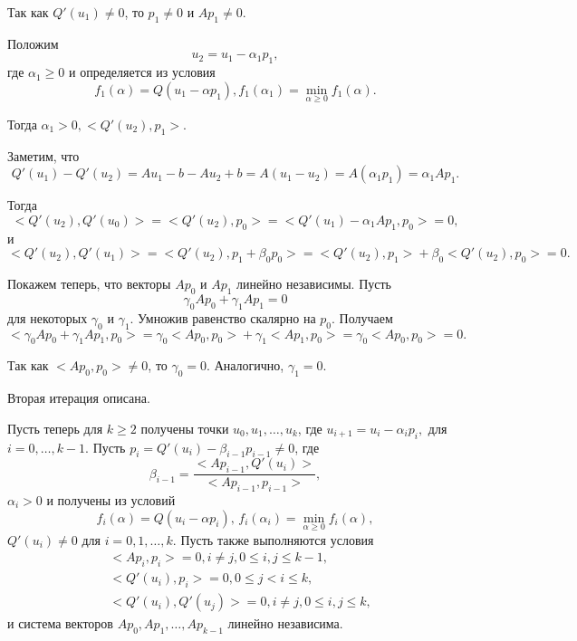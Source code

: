 Так как $Q'(u_1) \not = 0$, то $p_1 \not = 0$ и $A p_1 \not = 0$.

Положим 
\begin{equation*}
	u_2 = u_1 - \alpha_1 p_1, 
\end{equation*}
где $\alpha_1 \geqslant 0$ и определяется из условия 
\begin{equation*}
	f_1(\alpha) = Q(u_1 - \alpha p_1), f_1(\alpha_1) = \min_{\alpha \geqslant 0}{f_1(\alpha)}.
\end{equation*}

Тогда $\alpha_1 > 0, \big<Q'(u_2), p_1\big>$.

Заметим, что 
\begin{equation*}
	Q'(u_1) - Q'(u_2) = A u_1 - b - A u_2 + b = A (u_1 - u_2) = A(\alpha_1 p_1) = \alpha_1 A p_1.
\end{equation*}

Тогда 
\begin{equation*}
	\big<Q'(u_2), Q'(u_0)\big> = \big<Q'(u_2), p_0\big> = \big<Q'(u_1) - \alpha_1 A p_1, p_0\big> = 0,
\end{equation*}
и
\begin{equation*}
	\big<Q'(u_2), Q'(u_1)\big> = \big<Q'(u_2), p_1 + \beta_0 p_0\big> = \big<Q'(u_2), p_1\big> + \beta_0 \big<Q'(u_2), p_0\big> = 0.
\end{equation*}

Покажем теперь, что векторы $A p_0$ и $A p_1$ линейно независимы. Пусть \[\gamma_0 A p_0 + \gamma_1 A p_1 = 0\] для некоторых $\gamma_0$ и $\gamma_1$. Умножив равенство скалярно на $p_0$. Получаем 
\begin{equation*}
	\big<\gamma_0 A p_0 + \gamma_1 A p_1, p_0\big> = \gamma_0 \big<A p_0, p_0\big> + \gamma_1 \big<A p_1, p_0\big> = \gamma_0 \big<A p_0, p_0\big> = 0.
\end{equation*}

Так как $\big<A p_0, p_0\big> \not = 0$, то $\gamma_0 = 0$. Аналогично, $\gamma_1 = 0$.

Вторая итерация описана.

Пусть теперь для $k \geqslant 2$ получены точки $u_0, u_1, \dotsc, u_k$, где $u_{i + 1} = u_i - \alpha_i p_i,$ для $i = 0, \dotsc, k - 1$. Пусть $p_i = Q'(u_i) - \beta_{i - 1} p_{i - 1} \not = 0$, где
\begin{equation*}
	\beta_{i - 1} = \frac{\big<A p_{i - 1}, Q'(u_i)\big>}{\big<A p_{i - 1}, p_{i - 1}\big>},
\end{equation*}
$\alpha_i > 0$ и получены из условий 
\begin{equation*}
	f_i(\alpha) = Q(u_i - \alpha p_i), \, f_i(\alpha_i) = \min_{\alpha \geqslant 0}{f_i(\alpha)},
\end{equation*}
$Q'(u_i) \not = 0$ для $i = 0, 1, \dotsc, k$. Пусть также выполняются условия 
\begin{align*}
	&\big<A p_i, p_i\big> = 0, i \not = j, 0 \leqslant i, j \leqslant k - 1, \\
	&\big<Q'(u_i), p_i\big> = 0, 0 \leqslant j < i \leqslant k, \\
	&\big<Q'(u_i), Q'(u_j)\big> = 0, i \not = j, 0 \leqslant i, j \leqslant k,
\end{align*}
и система векторов $A p_0, A p_1, \dotsc, A p_{k - 1}$ линейно независима. 

